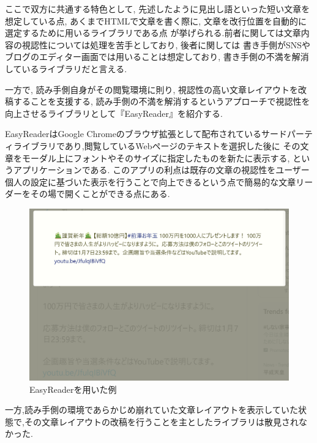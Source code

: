 ここで双方に共通する特色として, 先述したように見出し語といった短い文章を想定している点, 
あくまでHTMLで文章を書く際に, 文章を改行位置を自動的に選定するために用いるライブラリである点
が挙げられる.前者に関しては文章内容の視認性については処理を苦手としており, 後者に関しては
書き手側がSNSやブログのエディター画面では用いることは想定しており, 
書き手側の不満を解消しているライブラリだと言える.

一方で, 読み手側自身がその閲覧環境に則り, 視認性の高い文章レイアウトを改稿することを支援する, 
読み手側の不満を解消するというアプローチで視認性を向上させるライブラリとして『EasyReader』\footnotemark[4]
を紹介する.


EasyReaderはGoogle Chromeのブラウザ拡張として配布されているサードパーティライブラリであり,閲覧しているWebページのテキストを選択した後に
その文章をモーダル上にフォントやそのサイズに指定したものを新たに表示する, というアプリケーションである.
このアプリの利点は既存の文章の視認性をユーザー個人の設定に基づいた表示を行うことで向上できるという点で簡易的な文章リーダーをその場で開くことができる点にある.

\begin{figure}[H]
    \centering
    \label{fig:image_5}
    \includegraphics[width=0.6\columnwidth]{image/02/img_5.png}
    \caption[EasyReaderを用いた例]{EasyReaderを用いた例}
\end{figure}

一方,読み手側の環境であらかじめ崩れていた文章レイアウトを表示していた状態で,その文章レイアウトの改稿を行うことを主としたライブラリは散見されなかった.


